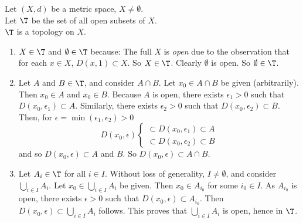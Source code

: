 Let $(X,d)$ be a metric space, $X\neq\emptyset$. \\
Let $\T$ be the set of all open subsets of $X$. \\
\prop $\T$ is a topology on $X$. \\
\pf
\begin{enumerate}[label=(\roman*)]
\item $X\in\T$ and $\emptyset\in\T$ because: The full $X$ is \emph{open} due to the observation that for each $x\in X$, $D(x,1)\subset X$.  So $X\in\T$.  Clearly $\emptyset$ is open.  So $\emptyset\in\T$.
\item Let $A$ and $B\in\T$, and consider $A\cap B$.  Let $x_0\in A\cap B$ be given (arbitrarily).  Then $x_0\in A$ and $x_0\in B$.  Because $A$ is open, there exists $\epsilon_1>0$ such that $D(x_0,\epsilon_1)\subset A$.  Similarly, there exists $\epsilon_2>0$ such that $D(x_0,\epsilon_2)\subset B$.  Then, for $\epsilon=\min(\epsilon_1,\epsilon_2)>0$
\[ D(x_0,\epsilon) \left\{ \begin{gathered}
\subset D(x_0,\epsilon_1) \subset A \\
\subset D(x_0,\epsilon_2) \subset B
\end{gathered} \right. \]
and so $D(x_0,\epsilon)\subset A$ and $B$.  So $D(x_0,\epsilon)\subset A\cap B$.
\item Let $A_i\in\T$ for all $i\in I$.  Without loss of generality, $I\neq\emptyset$, and consider $\bigcup_{i\in I}A_i$.  Let $x_0\in\bigcup_{i\in I}A_i$ be given.  Then $x_0\in A_{i_0}$ for some $i_0\in I$.  As $A_{i_0}$ is open, there exists $\epsilon>0$ such that $D(x_0,\epsilon)\subset A_{i_0}$.  Then $D(x_0,\epsilon)\subset\bigcup_{i\in I}A_i$ follows.  This proves that $\bigcup_{i\in I}A_i$ is open, hence in $\T$.
\end{enumerate}
